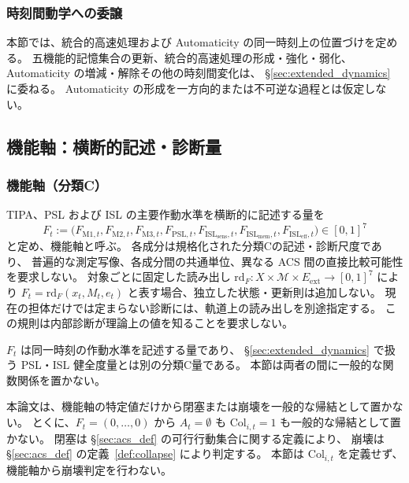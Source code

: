\subsubsection{時刻間動学への委譲}
\label{subsubsec:fast_boundary}

本節では、統合的高速処理および Automaticity の同一時刻上の位置づけを定める。
五機能的記憶集合の更新、統合的高速処理の形成・強化・弱化、
Automaticity の増減・解除その他の時刻間変化は、
\S\ref{sec:extended_dynamics} に委ねる。
Automaticity の形成を一方向的または不可逆な過程とは仮定しない。

\subsection{機能軸：横断的記述・診断量}
\label{subsec:functional_axis}

\subsubsection{機能軸（分類C）}
\label{subsubsec:functional_axis}

\begin{definition}
\label{def:functional_axis}
TIPA、PSL および ISL の主要作動水準を横断的に記述する量を
\[
  F_t
  :=
  \bigl(
    F_{\mathrm{M1},t},
    F_{\mathrm{M2},t},
    F_{\mathrm{M3},t},
    F_{\mathrm{PSL},t},
    F_{\mathrm{ISL}_{\mathrm{sens}},t},
    F_{\mathrm{ISL}_{\mathrm{mem}},t},
    F_{\mathrm{ISL}_{\mathrm{eff}},t}
  \bigr)
  \in[0,1]^7
\]
と定め、機能軸と呼ぶ。
各成分は規格化された分類Cの記述・診断尺度であり、
普遍的な測定写像、各成分間の共通単位、異なる ACS 間の直接比較可能性を要求しない。
対象ごとに固定した読み出し
$\mathrm{rd}_F:X\times\mathcal M\times E_{\mathrm{ext}}\to[0,1]^7$ により
$F_t=\mathrm{rd}_F(x_t,M_t,e_t)$ と表す場合、独立した状態・更新則は追加しない。
現在の担体だけでは定まらない診断には、軌道上の読み出しを別途指定する。
この規則は内部診断が理論上の値を知ることを要求しない。
\end{definition}

\begin{remark}[機能軸と健全度]
\label{rem:psl_health_bridge_s5}
$F_t$ は同一時刻の作動水準を記述する量であり、
\S\ref{sec:extended_dynamics} で扱う PSL・ISL 健全度量とは別の分類C量である。
本節は両者の間に一般的な関数関係を置かない。
\end{remark}

\begin{remark}
\label{rem:functional_axis_noncollapse}
本論文は、機能軸の特定値だけから閉塞または崩壊を一般的な帰結として置かない。
とくに、$F_t=(0,\ldots,0)$ から
$A_t=\emptyset$ も $\mathrm{Col}_{i,t}=1$ も一般的な帰結として置かない。
閉塞は \S\ref{sec:acs_def} の可行行動集合に関する定義により、
崩壊は \S\ref{sec:acs_def} の定義~\ref{def:collapse} により判定する。
本節は $\mathrm{Col}_{i,t}$ を定義せず、機能軸から崩壊判定を行わない。
\end{remark}


